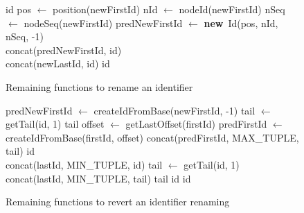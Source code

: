 \documentclass[12pt]{thesul}
\newcommand{\new}{\textbf{new}}
\begin{document}
\begin{figure}[!ht]
  \footnotesize
  \begin{algorithmic}
          \State \Return id
      \Else
          \State pos $\gets$ position(newFirstId)
          \State nId $\gets$ nodeId(newFirstId)
          \State nSeq $\gets$ nodeSeq(newFirstId)
          \State predNewFirstId $\gets$ \new~Id(pos, nId, nSeq, -1)
          \\
          \State \Return concat(predNewFirstId, id)
          \EndIf
      \EndFunction
      \\
              \State \Return concat(newLastId, id)
          \Else
              \State \Return id
          \EndIf
      \EndFunction
  \end{algorithmic}
  \caption{Remaining functions to rename an identifier}
  \label{alg:appendix-rename-id}
\end{figure}


\label{app:revert-rename-id}

\begin{figure}[!ht]
  \footnotesize
  \begin{algorithmic}
          \State predNewFirstId $\gets$ createIdFromBase(newFirstId, -1)
              \State tail $\gets$ getTail(id, 1)
                  \State \Return tail
              \Else
                  \State {}
                  \State offset $\gets$ getLastOffset(firstId)
                  \State predFirstId $\gets$ createIdFromBase(firstId, offset)
                  \State \Return concat(predFirstId, MAX\_TUPLE, tail)
              \EndIf
          \Else
              \State \Return id
          \EndIf
      \EndFunction
      \\
              \State {}
              \State \Return concat(lastId, MIN\_TUPLE, id)
              \State tail $\gets$ getTail(id, 1)
                  \State {}
                  \State \Return concat(lastId, MIN\_TUPLE, tail)
                  \State \Return tail
              \Else
                  \State {}
                  \State \Return id
              \EndIf
          \Else
              \State \Return id
          \EndIf
      \EndFunction
  \end{algorithmic}
  \caption{Remaining functions to revert an identifier renaming}
  \label{alg:appendix-revert-rename-id}
\end{figure}
\end{document}
